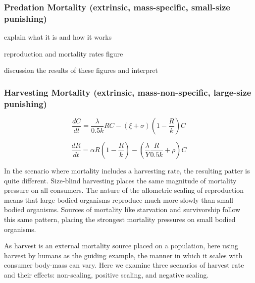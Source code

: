 \documentclass[]{rsos}%
\begin{document}
\subsubsection{Predation Mortality (extrinsic, mass-specific, small-size punishing)}

explain what it is and how it works 
	
reproduction and mortality rates figure
	
discussion the results of these figures and interpret


\subsubsection{Harvesting Mortality (extrinsic, mass-non-specific, large-size punishing)}

\vspace{0.5cm}


\begin{equation}
    \frac{dC}{dt}= \frac{\lambda}{0.5k}RC- (\xi+\sigma)(1 - \frac{R}{k})C
\end{equation}

\vspace{0.5cm}

\begin{equation}
    \frac{dR}{dt} = \alpha R(1 - \frac{R}{k}) - (\frac{\lambda}{Y}\frac{R}{0.5k} + \rho)C
\end{equation}


\vspace{0.5cm}

In the scenario where mortality includes a harvesting rate, the resulting patter is quite different. Size-blind harvesting places the same magnitude of mortality pressure on all consumers. The nature of the allometric scaling of reproduction means that large bodied organisms reproduce much more slowly than small bodied organisms. Sources of mortality like starvation and survivorship follow this same pattern, placing the strongest mortality pressures on small bodied organisms. 

As harvest is an external mortality source placed on a population, here using harvest by humans as the guiding example, the manner in which it scales with consumer body-mass can vary. Here we examine three scenarios of harvest rate and their effects: non-scaling, positive scaling, and negative scaling. \\

\vspace{0.5cm}
\end{document}
